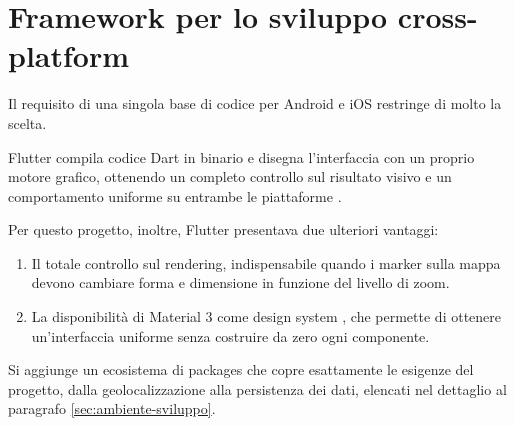 \section{Framework per lo sviluppo cross-platform}\label{sec:framework-cross-platform}

Il requisito di una singola base di codice per Android e iOS restringe di molto la scelta.
%

Flutter compila codice Dart in binario e disegna l'interfaccia con un proprio motore
grafico, ottenendo un completo controllo sul risultato visivo e un comportamento uniforme su entrambe le piattaforme \cite{flutterDocs, dartLang}.

Per questo progetto, inoltre, Flutter presentava due ulteriori vantaggi:
\begin{enumerate}
  \item Il totale controllo sul rendering, indispensabile quando i marker sulla mappa devono cambiare forma e dimensione
  in funzione del livello di zoom.
  \item La disponibilità di Material 3 come design system \cite{material3}, che permette di
  ottenere un'interfaccia uniforme senza costruire da zero ogni componente.
\end{enumerate}

Si aggiunge un ecosistema di packages che copre esattamente le esigenze del progetto, dalla geolocalizzazione alla
persistenza dei dati, elencati nel dettaglio al paragrafo \ref{sec:ambiente-sviluppo}.
